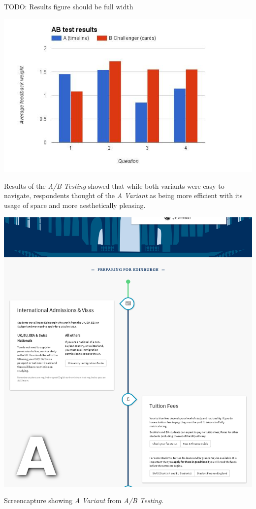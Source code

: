\documentclass[a4paper, notoc]{tufte-handout}
\begin{document}
TODO: Results figure should be full width

\begin{marginfigure}
  \includegraphics[width=\linewidth]{abresults.png}
  \caption{
    \label{fig:abresults}
    Results of the \textit{A/B Testing} showed that while both variants were easy to navigate, 
    respondents thought of the \textit{A Variant} as being more efficient with its usage of space 
    and more aesthetically pleasing.
  }
\end{marginfigure}


\begin{marginfigure}
  \includegraphics[width=\linewidth]{avariant.png}
  \caption{
    \label{fig:avariant}
    Screencapture showing \textit{A Variant} from \textit{A/B Testing}.
  }

\end{marginfigure}
\end{document}
